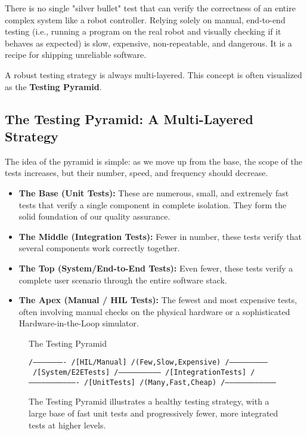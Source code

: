 There is no single "silver bullet" test that can verify the correctness of an entire complex system like a robot controller. Relying solely on manual, end-to-end testing (i.e., running a program on the real robot and visually checking if it behaves as expected) is slow, expensive, non-repeatable, and dangerous. It is a recipe for shipping unreliable software.

A robust testing strategy is always multi-layered. This concept is often visualized as the \textbf{Testing Pyramid}.

\subsection{The Testing Pyramid: A Multi-Layered Strategy}
\label{subsec:testing_pyramid}

The idea of the pyramid is simple: as we move up from the base, the scope of the tests increases, but their number, speed, and frequency should decrease.
\begin{itemize}
    \item \textbf{The Base (Unit Tests):} These are numerous, small, and extremely fast tests that verify a single component in complete isolation. They form the solid foundation of our quality assurance.
    \item \textbf{The Middle (Integration Tests):} Fewer in number, these tests verify that several components work correctly together.
    \item \textbf{The Top (System/End-to-End Tests):} Even fewer, these tests verify a complete user scenario through the entire software stack.
    \item \textbf{The Apex (Manual / HIL Tests):} The fewest and most expensive tests, often involving manual checks on the physical hardware or a sophisticated Hardware-in-the-Loop simulator.
\end{itemize}

\begin{figure}[h!]
    \centering
    \begin{infobox}{The Testing Pyramid}
        {\footnotesize
        \begin{alltt}
           /----------------------\
          /    [ HIL / Manual ]    \
         / (Few, Slow, Expensive)  \
        /--------------------------\
       /   [ System / E2E Tests ]   \
      /------------------------------\
     /     [ Integration Tests ]      \
    /----------------------------------\
   /          [ Unit Tests ]          \
  /        (Many, Fast, Cheap)       \
 /------------------------------------\
        \end{alltt}
        }
    \end{infobox}
    \vspace{0.3cm}
    \caption{The Testing Pyramid illustrates a healthy testing strategy, with a large base of fast unit tests and progressively fewer, more integrated tests at higher levels.}
    \label{fig:testing_pyramid_pseudo_simple}
\end{figure}

